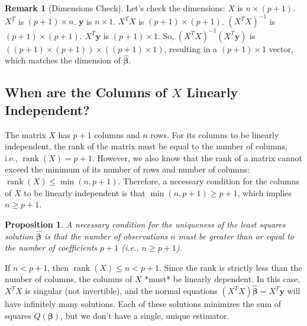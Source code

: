 \documentclass[11pt]{article}
\newtheorem{proposition}[theorem]{Proposition}
\theoremstyle{definition}
\newtheorem{remark}[theorem]{Remark}
\newcommand{\T}{^T} %
\DeclareMathOperator{\rank}{rank}
\begin{document}
\begin{remark}[Dimensions Check]
Let's check the dimensions:
$X$ is $n \times (p+1)$.
$X\T$ is $(p+1) \times n$.
$\mathbf{y}$ is $n \times 1$.
$X\T X$ is $(p+1) \times (p+1)$.
$(X\T X)^{-1}$ is $(p+1) \times (p+1)$.
$X\T \mathbf{y}$ is $(p+1) \times 1$.
So, $(X\T X)^{-1} (X\T \mathbf{y})$ is $((p+1) \times (p+1)) \times ((p+1) \times 1)$, resulting in a $(p+1) \times 1$ vector, which matches the dimension of $\hat{\boldsymbol{\beta}}$.
\end{remark}

\subsection{When are the Columns of \(X\) Linearly Independent?}

The matrix $X$ has $p+1$ columns and $n$ rows. For its columns to be linearly independent, the rank of the matrix must be equal to the number of columns, i.e., $\rank(X) = p+1$.
However, we also know that the rank of a matrix cannot exceed the minimum of its number of rows and number of columns: $\rank(X) \le \min(n, p+1)$.
Therefore, a necessary condition for the columns of $X$ to be linearly independent is that $\min(n, p+1) \ge p+1$, which implies $n \ge p+1$.

\begin{proposition}
A necessary condition for the uniqueness of the least squares solution $\hat{\boldsymbol{\beta}}$ is that the number of observations $n$ must be greater than or equal to the number of coefficients $p+1$ (i.e., $n \ge p+1$).
\end{proposition}

If $n < p+1$, then $\rank(X) \le n < p+1$. Since the rank is strictly less than the number of columns, the columns of $X$ *must* be linearly dependent. In this case, $X\T X$ is singular (not invertible), and the normal equations $(X\T X)\hat{\boldsymbol{\beta}} = X\T \mathbf{y}$ will have infinitely many solutions. Each of these solutions minimizes the sum of squares $Q(\boldsymbol{\beta})$, but we don't have a single, unique estimator.
\end{document}
